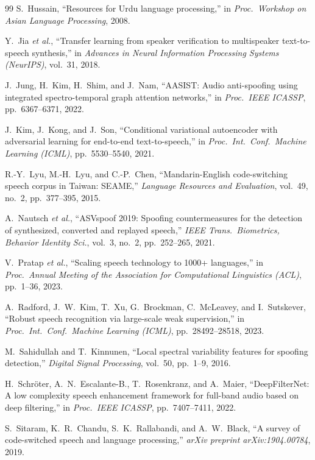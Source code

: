 \documentclass[10pt,twocolumn]{article}
\begin{document}
\begin{thebibliography}{99}
S.~Hussain,
``Resources for Urdu language processing,''
in \emph{Proc.\ Workshop on Asian Language Processing}, 2008.

Y.~Jia \emph{et al.},
``Transfer learning from speaker verification to multispeaker text-to-speech synthesis,''
in \emph{Advances in Neural Information Processing Systems (NeurIPS)}, vol.~31, 2018.

J.~Jung, H.~Kim, H.~Shim, and J.~Nam,
``AASIST: Audio anti-spoofing using integrated spectro-temporal graph attention networks,''
in \emph{Proc.\ IEEE ICASSP}, pp.~6367--6371, 2022.

J.~Kim, J.~Kong, and J.~Son,
``Conditional variational autoencoder with adversarial learning for end-to-end text-to-speech,''
in \emph{Proc.\ Int.\ Conf.\ Machine Learning (ICML)}, pp.~5530--5540, 2021.

R.-Y.~Lyu, M.-H.~Lyu, and C.-P.~Chen,
``Mandarin-English code-switching speech corpus in Taiwan: SEAME,''
\emph{Language Resources and Evaluation}, vol.~49, no.~2, pp.~377--395, 2015.

A.~Nautsch \emph{et al.},
``ASVspoof 2019: Spoofing countermeasures for the detection of synthesized, converted and replayed speech,''
\emph{IEEE Trans.\ Biometrics, Behavior Identity Sci.}, vol.~3, no.~2, pp.~252--265, 2021.

V.~Pratap \emph{et al.},
``Scaling speech technology to 1000+ languages,''
in \emph{Proc.\ Annual Meeting of the Association for Computational Linguistics (ACL)}, pp.~1--36, 2023.

A.~Radford, J.~W.~Kim, T.~Xu, G.~Brockman, C.~McLeavey, and I.~Sutskever,
``Robust speech recognition via large-scale weak supervision,''
in \emph{Proc.\ Int.\ Conf.\ Machine Learning (ICML)}, pp.~28492--28518, 2023.

M.~Sahidullah and T.~Kinnunen,
``Local spectral variability features for spoofing detection,''
\emph{Digital Signal Processing}, vol.~50, pp.~1--9, 2016.

H.~Schr\"{o}ter, A.~N.~Escalante-B., T.~Rosenkranz, and A.~Maier,
``DeepFilterNet: A low complexity speech enhancement framework for full-band audio based on deep filtering,''
in \emph{Proc.\ IEEE ICASSP}, pp.~7407--7411, 2022.

S.~Sitaram, K.~R.~Chandu, S.~K.~Rallabandi, and A.~W.~Black,
``A survey of code-switched speech and language processing,''
\emph{arXiv preprint arXiv:1904.00784}, 2019.


\end{thebibliography}
\end{document}
